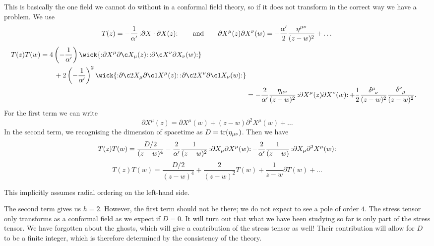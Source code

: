 This is basically the one field we cannot do without in a conformal field theory, so if it does not transform in the correct way we have a problem.
We use
\begin{equation}
  T(z) = -\frac{1}{\alpha'} \mathop{:}\nolimits\! \partial X \cdot \partial X(z)\!\mathop{:}\nolimits \qquad \text{and} \qquad 
  \partial X^{\mu}(z) \partial X^{\nu}(w) = -\frac{\alpha'}{2} \frac{\eta^{\mu\nu}}{(z - w)^2} + \dots
\end{equation}
\begin{align}
  \begin{split}
    T(z) T(w) &= 4 \left( -\frac{1}{\alpha'} \right) \wick{\normalorder{ \partial X^{\mu}  \partial \c X_{\mu}(z)} \normalorder{\partial \c X^{\nu} \partial X_{\nu} (w)}} \\
	      &\qquad {} + 2 \left( - \frac{1}{\alpha'} \right)^2 \wick{ \normalorder{\partial \c2 X_{\mu} \partial \c1 X^{\mu}(z) } \normalorder{\partial \c2 X^{\nu} \partial \c1 X_{\nu}(w)} }
  \end{split} \\
  &= -\frac{2}{\alpha'} \frac{\eta_{\mu\nu}}{(z - w)^2} \normalorder{\partial X^{\mu}(z) \partial X^{\nu}(w)} + \frac{1}{2} \frac{\delta\indices{^{\mu}_{\nu}}}{(z - w)^2} \frac{\delta\indices{^{\nu}_{\mu}}}{(z - w)^2}.
\end{align}
For the first term we can write 
\begin{equation}
  \partial X^{\mu} (z) = \partial X^{\mu}(w) + (z - w) \partial^2 X^{\mu}(w) + \dots
\end{equation}
In the second term, we recognising the dimension of spacetime as $D = \tr(\eta_{\mu\nu})$. Then we have
\begin{equation}
  T(z) T(w) = \frac{D/2}{(z - w)^4} - \frac{2}{\alpha'} \frac{1}{(z - w)^2} \mathop{:}\nolimits\!\partial X_{\mu} \partial X^{\mu} (w)\!\mathop{:}\nolimits - \frac{2}{\alpha'} \frac{1}{(z - w)} \mathop{:}\nolimits\!\partial X_{\mu} \partial^2 X^{\mu}(w)\!\mathop{:}\nolimits
\end{equation}
\begin{equation}
  \boxed{T(z) T(w) = \frac{D / 2}{(z - w)^4} + \frac{2}{(z - w)^2} T(w) + \frac{1}{z - w} \partial T(w) + \dots}
\end{equation}
\begin{leftbar}
  This implicitly assumes radial ordering on the left-hand side.
\end{leftbar}
The second term gives us $h = 2$. However, the first term should not be there; we do not expect to see a pole of order $4$.
The stress tensor only transforms as a conformal field as we expect if $D = 0$.
It will turn out that what we have been studying so far is only part of the stress tensor.
We have forgotten about the ghosts, which will give a contribution of the stress tensor as well!
Their contribution will allow for $D$ to be a finite integer, which is therefore determined by the consistency of the theory.

